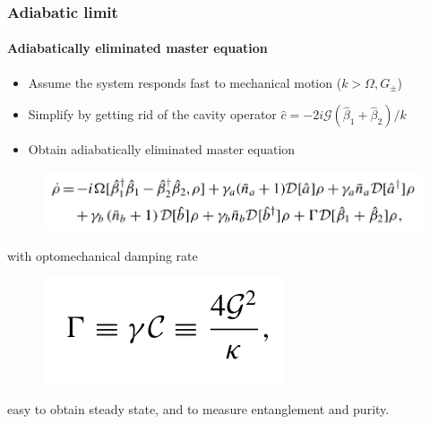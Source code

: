 \documentclass[aspectratio=43]{beamer}
\begin{document}
\begin{frame}
	
	\frametitle{Adiabatic limit}
	\framesubtitle{Adiabatically eliminated master equation}
	
	\begin{itemize}
		\item Assume the system responds fast to mechanical motion ($k > \Omega, G_{\pm}$)
		\item Simplify by getting rid of the cavity operator $\hat{c} = -2i\mathcal{G}(\hat{\beta}_{1} + \hat{\beta}_{2})/k$\\
		\item Obtain adiabatically eliminated master equation
	\end{itemize}

	\begin{figure}
		\includegraphics[width = 9 cm]{plots/master_eq_2.png}
	\end{figure}

	with optomechanical damping rate
	\begin{figure}
		\includegraphics[width = 3 cm]{plots/optomechanic_dumping.png}
	\end{figure}

	easy to obtain steady state, and to measure entanglement and purity.
	 
\end{frame}
\end{document}
